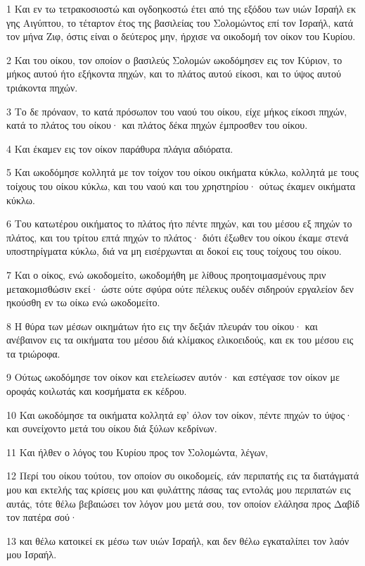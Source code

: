 \par 1 Και εν τω τετρακοσιοστώ και ογδοηκοστώ έτει από της εξόδου των υιών Ισραήλ εκ γης Αιγύπτου, το τέταρτον έτος της βασιλείας του Σολομώντος επί τον Ισραήλ, κατά τον μήνα Ζιφ, όστις είναι ο δεύτερος μην, ήρχισε να οικοδομή τον οίκον του Κυρίου.
\par 2 Και του οίκου, τον οποίον ο βασιλεύς Σολομών ωκοδόμησεν εις τον Κύριον, το μήκος αυτού ήτο εξήκοντα πηχών, και το πλάτος αυτού είκοσι, και το ύψος αυτού τριάκοντα πηχών.
\par 3 Το δε πρόναον, το κατά πρόσωπον του ναού του οίκου, είχε μήκος είκοσι πηχών, κατά το πλάτος του οίκου· και πλάτος δέκα πηχών έμπροσθεν του οίκου.
\par 4 Και έκαμεν εις τον οίκον παράθυρα πλάγια αδιόρατα.
\par 5 Και ωκοδόμησε κολλητά με τον τοίχον του οίκου οικήματα κύκλω, κολλητά με τους τοίχους του οίκου κύκλω, και του ναού και του χρηστηρίου· ούτως έκαμεν οικήματα κύκλω.
\par 6 Του κατωτέρου οικήματος το πλάτος ήτο πέντε πηχών, και του μέσου εξ πηχών το πλάτος, και του τρίτου επτά πηχών το πλάτος· διότι έξωθεν του οίκου έκαμε στενά υποστηρίγματα κύκλω, διά να μη εισέρχωνται αι δοκοί εις τους τοίχους του οίκου.
\par 7 Και ο οίκος, ενώ ωκοδομείτο, ωκοδομήθη με λίθους προητοιμασμένους πριν μετακομισθώσιν εκεί· ώστε ούτε σφύρα ούτε πέλεκυς ουδέν σιδηρούν εργαλείον δεν ηκούσθη εν τω οίκω ενώ ωκοδομείτο.
\par 8 Η θύρα των μέσων οικημάτων ήτο εις την δεξιάν πλευράν του οίκου· και ανέβαινον εις τα οικήματα του μέσου διά κλίμακος ελικοειδούς, και εκ του μέσου εις τα τριώροφα.
\par 9 Ούτως ωκοδόμησε τον οίκον και ετελείωσεν αυτόν· και εστέγασε τον οίκον με οροφάς κοιλωτάς και κοσμήματα εκ κέδρου.
\par 10 Και ωκοδόμησε τα οικήματα κολλητά εφ' όλον τον οίκον, πέντε πηχών το ύψος· και συνείχοντο μετά του οίκου διά ξύλων κεδρίνων.
\par 11 Και ήλθεν ο λόγος του Κυρίου προς τον Σολομώντα, λέγων,
\par 12 Περί του οίκου τούτου, τον οποίον συ οικοδομείς, εάν περιπατής εις τα διατάγματά μου και εκτελής τας κρίσεις μου και φυλάττης πάσας τας εντολάς μου περιπατών εις αυτάς, τότε θέλω βεβαιώσει τον λόγον μου μετά σου, τον οποίον ελάλησα προς Δαβίδ τον πατέρα σού·
\par 13 και θέλω κατοικεί εκ μέσω των υιών Ισραήλ, και δεν θέλω εγκαταλίπει τον λαόν μου Ισραήλ.
